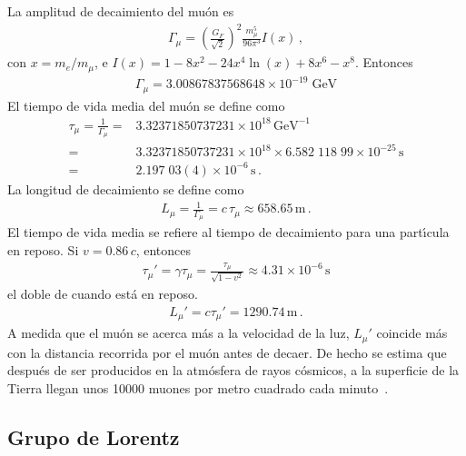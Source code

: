 \begin{frame}
\begin{example}
  La amplitud de decaimiento del mu\'on es
    \begin{align}
      \Gamma_\mu=\left(\frac{G_F}{\sqrt{2}}\right)^2\frac{m_\mu^5}{96\pi^3}I\left(x\right)\,,
    \end{align}
    con $x=m_e/m_\mu$, e $I(x)=1-8x^2-24x^4\ln(x)+8x^6-x^8$.
    Entonces
    \begin{align}
      \Gamma_\mu=3.00867837568648 \times 10^{- 19} \; \text{GeV}
    \end{align}
    El tiempo de vida media del mu\'on se define como
    \begin{align}
      \tau_\mu=\frac{1}{\Gamma_\mu}=&3.32371850737231\times10^{18}\,\text{GeV}^{-1}\nonumber\\
      =&3.32371850737231\times10^{18}\times6.582\;118\;99\times10^{-25}\,\text{s}\nonumber\\
      =&2.197\;03(4)\times10^{-6}\,\text{s}\,.
    \end{align}
La longitud de decaimiento se define como
\begin{align}
  L_\mu=\frac{1}{\Gamma_\mu}=c\,\tau_\mu\approx658.65\,\text{m}\,.
\end{align}
El tiempo de vida media se refiere al tiempo de decaimiento para una part\'\i cula en reposo. Si $v=0.86\,c$, entonces
\begin{align}
  \tau_\mu'=\gamma\tau_\mu=\frac{\tau_\mu}{\sqrt{1-v^2}}\approx4.31\times10^{-6}\,\text{s}
\end{align}
el doble de cuando est\'a en reposo. 
\begin{align}
  L_\mu'=c\tau_\mu'=1290.74\,\text{m}\,.
\end{align}
A medida que el mu\'on se acerca m\'as a la velocidad de la luz, $L_\mu'$ coincide m\'as con la distancia recorrida por el mu\'on antes de decaer. De hecho se estima que despu\'es de ser producidos en la atm\'osfera de rayos c\'osmicos, a la superficie de la Tierra llegan unos 10000 muones por metro cuadrado cada minuto~\cite{muon}.

\end{example}

\end{frame}

\subsection{Grupo de Lorentz}

